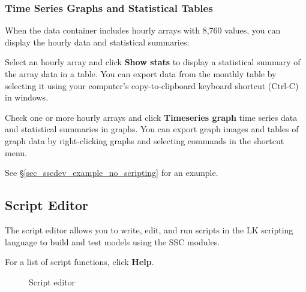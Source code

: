 \documentclass{article}
\begin{document}
\subsubsection{Time Series Graphs and Statistical Tables}
\label{sec_timeseries_statistical}

When the data container includes hourly arrays with 8,760 values, you can display the hourly data and statistical summaries:

Select an hourly array and click \textbf{Show stats} to display a statistical summary of the array data in a table. You can export data from the monthly table by selecting it using your computer's copy-to-clipboard keyboard shortcut (Ctrl-C) in windows.

Check one or more hourly arrays and click \textbf{Timeseries graph} time series data and statistical summaries in graphs. You can export graph images and tables of graph data by right-clicking graphs and selecting commands in the shortcut menu.


See \S\ref{sec_sscdev_example_no_scripting} for an example.

\subsection{Script Editor}
\label{sec_script_editor}

The script editor allows you to write, edit, and run scripts in the LK scripting language to build and test models using the SSC modules.

For a list of script functions, click \textbf{Help}.

\begin{figure}
\begin{center}
\end{center}
\caption{Script editor}
\label{fig_script_editor}
\end{figure}
\end{document}
